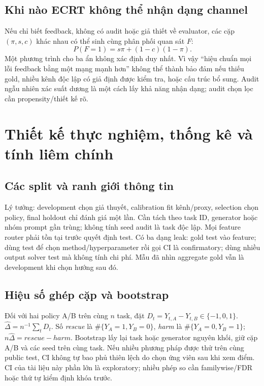 \documentclass[11pt,a4paper,openany]{book}
\begin{document}
\section{Khi nào ECRT không thể nhận dạng channel}
Nếu chỉ biết feedback, không có audit hoặc giả thiết về evaluator, các cặp \((\pi,s,c)\) khác nhau có thể sinh cùng phân phối quan sát \(F\):
\begin{equation}P(F=1)=s\pi+(1-c)(1-\pi).\end{equation}
Một phương trình cho ba ẩn không xác định duy nhất. Vì vậy ``hiệu chuẩn mọi lỗi feedback bằng một mạng mạnh hơn'' không thể thành bảo đảm nếu thiếu gold, nhiều kênh độc lập có giả định được kiểm tra, hoặc cấu trúc bổ sung. Audit ngẫu nhiên xác suất dương là một cách lấy khả năng nhận dạng; audit chọn lọc cần propensity/thiết kế rõ.

\chapter{Thiết kế thực nghiệm, thống kê và tính liêm chính}
\section{Các split và ranh giới thông tin}
Lý tưởng: development chọn giả thuyết, calibration fit kênh/proxy, selection chọn policy, final holdout chỉ đánh giá một lần. Cần tách theo task ID, generator hoặc nhóm prompt gần trùng; không tính seed audit là task độc lập. Mọi feature router phải tồn tại trước quyết định test. Có ba dạng leak: gold test vào feature; dùng test để chọn method/hyperparameter rồi gọi CI là confirmatory; dùng nhiều output solver test mà không tính chi phí. Mẫu đã nhìn aggregate gold vẫn là development khi chọn hướng sau đó.

\section{Hiệu số ghép cặp và bootstrap}
Đối với hai policy A/B trên cùng \(n\) task, đặt \(D_t=Y_{t,A}-Y_{t,B}\in\{-1,0,1\}\). \(\widehat\Delta=n^{-1}\sum_tD_t\). Số \emph{rescue} là \(\#\{Y_A=1,Y_B=0\}\), \emph{harm} là \(\#\{Y_A=0,Y_B=1\}\); \(n\widehat\Delta=rescue-harm\). Bootstrap lấy lại task hoặc generator nguyên khối, giữ cặp A/B và các seed trên cùng task. Nếu nhiều phương pháp được thử trên cùng public test, CI không tự bao phủ thiên lệch do chọn ứng viên sau khi xem điểm. CI của tài liệu này phần lớn là exploratory; nhiều phép so cần familywise/FDR hoặc thứ tự kiểm định khóa trước.
\end{document}
